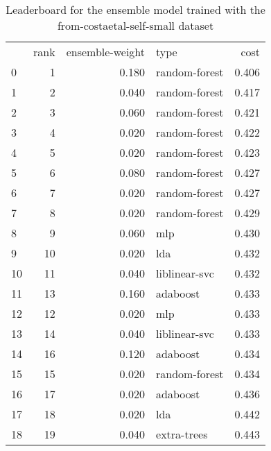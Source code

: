 \begin{table}[]
	\centering
	\begin{tabular}{lrrlr}
		   & rank & ensemble-weight & type          & cost  \\
		0  & 1    & 0.180           & random-forest & 0.406 \\
		1  & 2    & 0.040           & random-forest & 0.417 \\
		2  & 3    & 0.060           & random-forest & 0.421 \\
		3  & 4    & 0.020           & random-forest & 0.422 \\
		4  & 5    & 0.020           & random-forest & 0.423 \\
		5  & 6    & 0.080           & random-forest & 0.427 \\
		6  & 7    & 0.020           & random-forest & 0.427 \\
		7  & 8    & 0.020           & random-forest & 0.429 \\
		8  & 9    & 0.060           & mlp           & 0.430 \\
		9  & 10   & 0.020           & lda           & 0.432 \\
		10 & 11   & 0.040           & liblinear-svc & 0.432 \\
		11 & 13   & 0.160           & adaboost      & 0.433 \\
		12 & 12   & 0.020           & mlp           & 0.433 \\
		13 & 14   & 0.040           & liblinear-svc & 0.433 \\
		14 & 16   & 0.120           & adaboost      & 0.434 \\
		15 & 15   & 0.020           & random-forest & 0.434 \\
		16 & 17   & 0.020           & adaboost      & 0.436 \\
		17 & 18   & 0.020           & lda           & 0.442 \\
		18 & 19   & 0.040           & extra-trees   & 0.443 \\
	\end{tabular}

	\caption{Leaderboard for the ensemble model trained with the from-costaetal-self-small dataset}
	\label{tab:lb-from-costaetal-self-small-randsplit}
\end{table}

